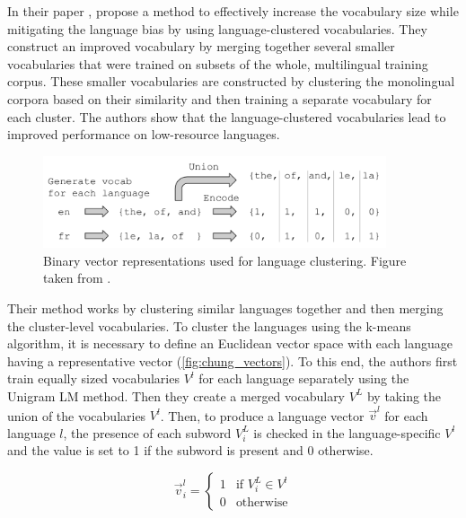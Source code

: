 In their paper  \cite{chung_improving_2020}, \citeauthor{chung_improving_2020} propose a method to effectively increase the vocabulary size while mitigating the language bias by using language-clustered vocabularies. They construct an improved vocabulary by merging together several smaller vocabularies that were trained on subsets of the whole, multilingual training corpus. These smaller vocabularies are constructed by clustering the monolingual corpora based on their similarity and then training a separate vocabulary for each cluster. The authors show that the language-clustered vocabularies lead to improved performance on low-resource languages.


\begin{figure}[ht]
    \centering
    \includegraphics[width=0.9\textwidth]{img/temp/chung_language_vectors.png}
    \caption{Binary vector representations used for language clustering. Figure taken from \cite{chung_improving_2020}.}
    \label{fig:chung_vectors}
\end{figure}

Their method works by clustering similar languages together and then merging the cluster-level vocabularies. To cluster the languages using the k-means algorithm, it is necessary to define an Euclidean vector space with each language having a representative vector (\autoref{fig:chung_vectors}). To this end, the authors first train equally sized vocabularies $V^l$ for each language separately using the Unigram LM method. Then they create a merged vocabulary $V^L$ by taking the union of the vocabularies $V^l$. Then, to produce a language vector $\vec{v}^l$ for each language $l$, the presence of each subword $V^L_i$ is checked in the language-specific $V^l$ and the value is set to 1 if the subword is present and 0 otherwise. 

\begin{equation}
    \vec{v}^l_i = \begin{cases}
        1 & \text{if } V^L_i \in V^l \\
        0 & \text{otherwise}
    \end{cases}
\end{equation}

